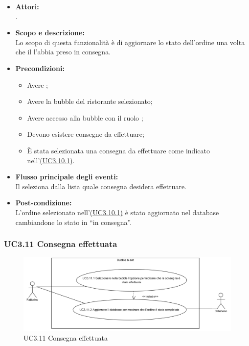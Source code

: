\begin{itemize}
	\item \textbf{Attori:}
	\\.
	\item \textbf{Scopo e descrizione:} 
	\\Lo scopo di questa funzionalità è di aggiornare lo stato dell'ordine una volta che il  l'abbia preso in consegna.
	\item \textbf{Precondizioni:}
	\begin{itemize}
		\item Avere ;
		\item Avere la bubble del ristorante selezionato;
		\item Avere accesso alla bubble con il ruolo ;
		\item Devono esistere consegne da effettuare;
		\item È stata selezionata una consegna da effettuare come indicato nell’\hyperref[UC3.10.1]{(UC3.10.1)}.
	\end{itemize}
	\item \textbf{Flusso principale degli eventi:}
	\\Il {} seleziona dalla lista quale consegna desidera effettuare.
	\item \textbf{Post-condizione:}
	\\L'ordine selezionato nell’\hyperref[UC3.10.1]{(UC3.10.1)} è stato aggiornato nel database cambiandone lo stato in “in consegna”.
\end{itemize}

\subsubsection{UC3.11 Consegna effettuata} \label{UC3.11}

\begin{figure}[H]
	\centering
	\includegraphics[width=15cm]{../../documenti/AnalisiDeiRequisiti/Diagrammi_img/uc3_11.png}
	\caption{UC3.11 Consegna effettuata}
\end{figure}

